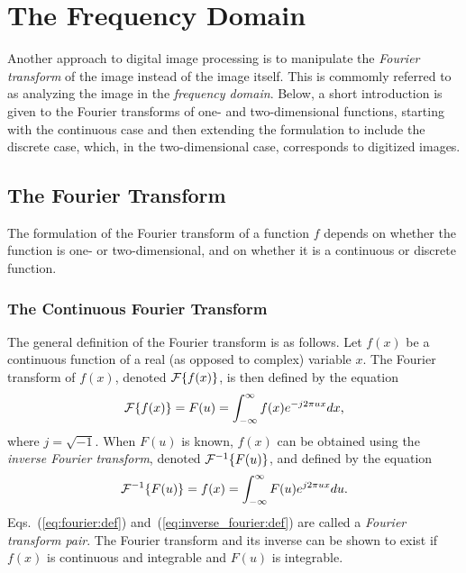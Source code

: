 
\section{The Frequency Domain}
\label{image:frequency}

Another approach to digital image processing is to manipulate the {\em
  Fourier transform\/} of the image instead of the image itself.  This
is commomly referred to as analyzing the image in the {\em frequency
  domain\/}.  Below, a short introduction is given to the Fourier
transforms of one- and two-dimensional functions, starting with the
continuous case and then extending the formulation to include the
discrete case, which, in the two-dimensional case, corresponds to
digitized images.

\subsection{The Fourier Transform}
\label{image:frequency:fourier}

The formulation of the Fourier transform of a function $f$ depends on
whether the function is one- or two-dimensional, and on whether it is
a continuous or discrete function.

\subsubsection{The Continuous Fourier Transform}

The general definition of the Fourier transform is as follows.  Let
$f(x)$ be a continuous function of a real (as opposed to complex)
variable $x$.  The Fourier transform of $f(x)$, denoted ${\cal
  F}\{f(x)\}$, is then defined by the equation
\begin{equation}
\label{eq:fourier:def}
{\cal F}\{f(x)\}=F(u)=\int_{-\infty}^{\infty}f(x)e^{-j2\pi
  ux}dx\mbox{,}
\end{equation}
where $j=\sqrt{-1}$.  When $F(u)$ is known, $f(x)$ can be obtained
using the {\em inverse Fourier transform\/}, denoted ${\cal
  F}^{-1}\{F(u)\}$, and defined by the equation
\begin{equation}
\label{eq:inverse_fourier:def}
{\cal F}^{-1}\{F(u)\}=f(x)=\int_{-\infty}^{\infty}F(u)e^{j2\pi
  ux}du\mbox{.}
\end{equation}
Eqs.~(\ref{eq:fourier:def}) and~(\ref{eq:inverse_fourier:def}) are
called a {\em Fourier transform pair\/}.  The Fourier transform and
its inverse can be shown to exist if $f(x)$ is continuous and
integrable and $F(u)$ is integrable.

